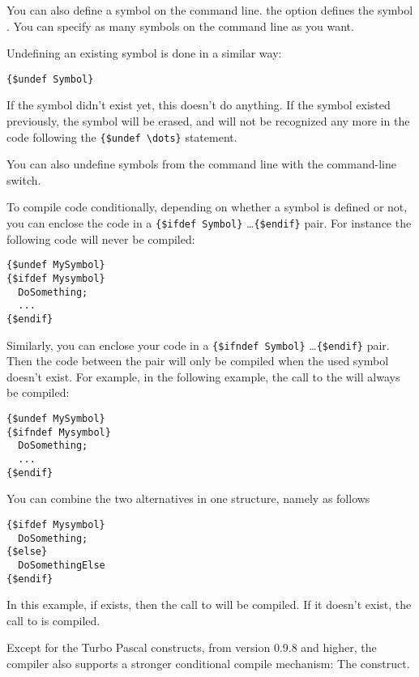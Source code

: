 You can also define a symbol on the command line. the  option
defines the symbol . You can specify as many symbols on the
command line as you want.

Undefining an existing symbol is done in a similar way:
\begin{verbatim}
{$undef Symbol}
\end{verbatim}
If the symbol didn't exist yet, this doesn't do anything. If the symbol
existed previously, the symbol will be erased, and will not be recognized
any more in the code following the \verb|{$undef \dots}| statement.

You can also undefine symbols from the command line with the 
command-line switch.

To compile code conditionally, depending on whether a symbol is defined or
not, you can enclose the code in a \verb|{$ifdef Symbol}| \dots \verb|{$endif}|
pair. For instance the following code will never be compiled:
\begin{verbatim}
{$undef MySymbol}
{$ifdef Mysymbol}
  DoSomething;
  ...
{$endif}
\end{verbatim}

Similarly, you can enclose your code in a \verb|{$ifndef Symbol}| \dots \verb|{$endif}|
pair. Then the code between the pair will only be compiled when the used
symbol doesn't exist. For example, in the following example, the call to the
 will always be compiled:
\begin{verbatim}
{$undef MySymbol}
{$ifndef Mysymbol}
  DoSomething;
  ...
{$endif}
\end{verbatim}

You can combine the two alternatives in one structure, namely as follows
\begin{verbatim}
{$ifdef Mysymbol}
  DoSomething;
{$else}
  DoSomethingElse
{$endif}
\end{verbatim}
In this example, if  exists, then the call to 
will be compiled. If it doesn't exist, the call to  is
compiled.

Except for the Turbo Pascal constructs, from version 0.9.8 and higher,
the \fpc compiler also supports a stronger conditional compile mechanism:
The  construct.

